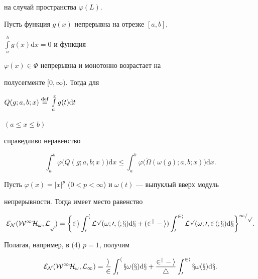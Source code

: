 на случай пространства $\varphi(L)$.








\begin{lemnonum} 


Пусть функция $g(x)$ непрерывна на отрезке $[a,b]$, 


$\int\limits_a^b g(x)\mathrm{d} x = 0$ и функция


$\varphi(x)\in\Phi$ непрерывна и монотонно возрастает на


полусегменте $[0,\infty)$. Тогда для 


$Q(g;a,b;x)\overset{\mathrm{def}}{=}{} \int\limits_a^x g(t) \mathrm{d} t$


$(a \leqslant x \leqslant b)$


справедливо неравенство


$$


\int_a^b \varphi\big( Q(g;a,b;x)\big)\mathrm{d} x \leqslant \int_a^b


\varphi\big( \widetilde{\Omega}(\omega(g);a,b; x)\big)\mathrm{d}x.


$$


\end{lemnonum}





\begin{cor}


Пусть $\varphi(x)=|x|^p$ ($0<p<\infty$) и $\omega(t)$ --- выпуклый вверх модуль


непрерывности. Тогда имеет место равенство


\begin{equation}


\cal E _N(W^1H_{\omega},L_p)= \bigg\{ 2i \int_0^h \cal{L}^p


(\omega;0,h;x)\mathrm{d} x + (2^k -i)\int_0^{2h} \cal{L}^p


(\omega;0,2h;x)\mathrm{d} x\bigg\}^{1/p}.


\end{equation}


\end{cor}





Полагая, например, в (4) $p=1$, получим


\begin{equation}


\cal E _N(W^1H_{\omega},L_1)=\frac{i}{2} \int_0^h x\omega(x)\mathrm{d} x


+ \frac{2^k-i}{4} \int_0^{2h} x\omega(x)\mathrm{d} x .


\end{equation}


